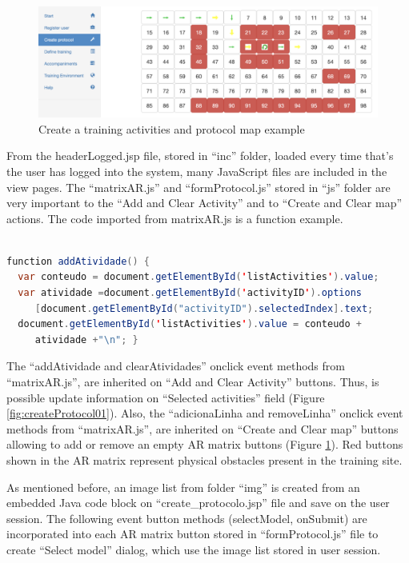 \begin{figure}[!hbt]
\begin{center}
\includegraphics[width=1\linewidth]{img/cap5/tCreateProtocol02}
\caption{Create a training activities and protocol map example} \label{fig:createProtocol02}
\end{center}
\vspace{-10pt}
\end{figure}

From the headerLogged.jsp file, stored in ``inc'' folder, loaded every time that's the user has logged into the system, many JavaScript files are included in the view pages. The ``matrixAR.js'' and ``formProtocol.js'' stored in ``js'' folder are very important to the ``Add and Clear Activity'' and to ``Create and Clear map'' actions. The code imported from matrixAR.js is a function example.
\newline
\begin{lstlisting}[frame=single,language=Java]  % Start your code-block

function addAtividade() {
  var conteudo = document.getElementById('listActivities').value;
  var atividade =document.getElementById('activityID').options
     [document.getElementById("activityID").selectedIndex].text;
  document.getElementById('listActivities').value = conteudo + 
     atividade +"\n"; }
\end{lstlisting}

The ``addAtividade and clearAtividades'' onclick event methods from ``matrixAR.js'', are inherited on ``Add and Clear Activity'' buttons. Thus, is possible update information on ``Selected activities'' field (Figure \ref{fig:createProtocol01}). Also, the ``adicionaLinha and removeLinha'' onclick event methods from ``matrixAR.js'', are inherited on ``Create and Clear map'' buttons allowing to add or remove an empty AR matrix buttons (Figure \ref{fig:createProtocol02}). Red buttons shown in the AR matrix represent physical obstacles present in the training site. 

As mentioned before, an image list from folder ``img'' is created from an embedded Java code block on ``create\_protocolo.jsp'' file and save on the user session. The following event button methods (selectModel, onSubmit) are incorporated into each AR matrix button stored in ``formProtocol.js'' file to create ``Select model'' dialog, which use the image list stored in user session. 

